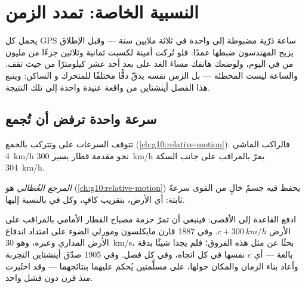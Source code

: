 \chapter{النسبية الخاصة: تمدد الزمن}\label{ch:g12:special-relativity}

يحمل كل  GPS ساعة ذرّية مضبوطة إلى  واحدة في ثلاثة
ملايين سنة --- وقبل الإطلاق يزيح المهندسون ضبطها عمدًا: فلو تُركت
أمينة لكسبت ثمانية وثلاثين جزءًا من مليون من  في اليوم، ولوضعك هاتفك
مساءَ الغد على بعد أحد عشر كيلومترًا من حيث تقف.
والساعة ليست المخطئة --- بل الزمن نفسه يدقّ دقًّا مختلفًا للمتحرك و
الساكن: ويتبع هذا الفصل أينشتاين من واقعة عنيدة واحدة إلى تلك النتيجة.

\section{سرعة واحدة ترفض أن تُجمع}

تتوقف السرعات على  وتتركب بالجمع
(\cref{ch:g10:relative-motion}): فالراكب الماشي  \qty{4}{km/h} نحو
مقدمة قطار يسير  \qty{300}{km/h} يمرّ بالمراقب على جانب السكة  \qty{304}{km/h}.

\begin{definition}\label{def:g12:special-relativity:inertial}
\emph{المرجع العُطالي} هو 
(\cref{ch:g10:relative-motion}) يحفظ فيه جسمٌ خالٍ من القوى سرعةً
ثابتة: أي الأرض، بتقريب كافٍ، وكل  في  بالنسبة إليها.
\end{definition}

ادفع القاعدة إلى الأقصى: فينبغي أن تمرّ حزمة مصباح القطار الأمامي
بالمراقب على الأرض  $c + \qty{300}{km/h}$. وفي 1887 قارن مايكلسون ومورلي
 الضوء على امتداد اندفاع الأرض المداري وعبره، وهو \qty{30}{km/s}،
بحثًا عن مثل هذه الفروق؛ فلم يجدا شيئًا بدقة بالغة
--- أي $c$ نفسها في كل اتجاه، وفي كل فصل. وفي 1905 صدّق أينشتاين
التجربة وأعاد بناء الزمان والمكان حولها، على مسلَّمتين
يُحكم عليهما بنتائجهما --- وقد اختُبرت منذ قرن دون فشل واحد.


